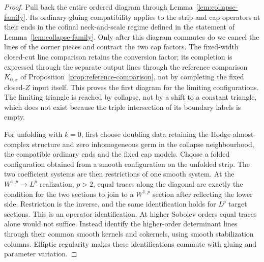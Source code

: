 \documentclass[11pt]{amsart}
\theoremstyle{definition}
\theoremstyle{remark}
\theoremstyle{plain}
\numberwithin{equation}{section}
\begin{document}
\begin{proof}
Pull back the entire ordered diagram through
Lemma~\ref{lem:collapse-family}. Its ordinary-gluing compatibility
applies to the strip and cap operators at their ends in the cofinal
neck-and-scale regime defined in the statement of
Lemma~\ref{lem:collapse-family}. Only after this diagram commutes do
we cancel the lines of the corner pieces and contract the two cap
factors.
The fixed-width closed-cut line comparison retains the conversion
factor; its completion is expressed through the separate output
lines through the reference comparison $K_{0,x}$ of
Proposition~\ref{prop:reference-comparison}, not by completing the
fixed closed-$Z$ input itself. This proves the first diagram for
the limiting configurations. The limiting triangle is reached by
collapse, not by a shift to a constant triangle, which does not exist
because the triple intersection of its boundary labels is empty.

For unfolding with $k=0$, first choose doubling data retaining the
Hodge almost-complex structure and zero inhomogeneous germ in the
collapse neighbourhood, the compatible ordinary ends and the fixed
cap models. Choose a folded
configuration obtained from a smooth configuration on the unfolded
strip. The two coefficient systems are then restrictions of one
smooth system. At the $W^{1,p}\to L^p$ realization, $p>2$, equal
traces along the diagonal are exactly the condition for the two
sections to join to a $W^{1,p}$ section after reflecting the lower
side. Restriction is the inverse, and the same identification holds
for $L^p$ target sections. This is an operator identification.
At higher Sobolev orders equal traces alone would not suffice.
Instead identify the higher-order determinant lines through their
common smooth kernels and cokernels, using smooth stabilization
columns. Elliptic regularity makes these identifications commute
with gluing and parameter variation.


\end{proof}
\end{document}
